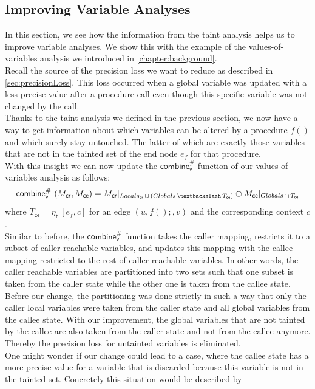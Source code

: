     \subsection{Improving Variable Analyses}\label{sec:formalImprove}
    In this section, we see how the information from the taint analysis helps us to improve variable analyses. We show this with the example of the values-of-variables analysis we introduced in \autoref{chapter:background}.\\
    Recall the source of the precision loss we want to reduce as described in \autoref{sec:precisionLoss}. This loss occurred when a global variable was updated with a less precise value after a procedure call even though this specific variable was not changed by the call.\\
    Thanks to the taint analysis we defined in the previous section, we now have a way to get information about which variables can be altered by a procedure $f()$ and which surely stay untouched. The latter of which are exactly those variables that are not in the tainted set of the end node $e_f$ for that procedure.\\
    With this insight we can now update the $\textsf{combine}^{\#}_\textsf{v}$ function of our values-of-variables analysis as follows:
    \[
      \textsf{combine}^{\#}_\textsf{v}\ (M_\textsf{cr}, M_\textsf{ce}) = M_\textsf{cr}|_{Locals_\textsf{cr}\, \cup\, (Globals\, \textbackslash\, T_\textsf{ce})} \oplus M_\textsf{ce}|_{Globals\, \cap\, T_\textsf{ce}}
    \]
    where $T_\textsf{ce} = \eta_\textsf{t}\ [e_f, c]$ for an edge $(u, f();, v)$ and the corresponding context $c$.\\
    Similar to before, the $\textsf{combine}^{\#}_\textsf{v}$ function takes the caller mapping, restricts it to a subset of caller reachable variables, and updates this mapping with the callee mapping restricted to the rest of caller reachable variables. In other words, the caller reachable variables are partitioned into two sets such that one subset is taken from the caller state while the other one is taken from the callee state. Before our change, the partitioning was done strictly in such a way that only the caller local variables were taken from the caller state and all global variables from the callee state. With our improvement, the global variables that are not tainted by the callee are also taken from the caller state and not from the callee anymore. Thereby the precision loss for untainted variables is eliminated.
    \\
    One might wonder if our change could lead to a case, where the callee state has a more precise value for a variable that is discarded because this variable is not in the tainted set. Concretely this situation would be described by 
